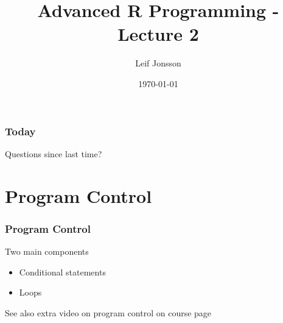 \documentclass{beamer}
\title[Lecture 2]{Advanced R Programming - Lecture 2} %
\author{Leif Jonsson} %
\institute[STIMA LiU] %
{
Link\"{o}ping University \\ %
\medskip
\textit{leif.jonsson@ericsson.com\\leif.r.jonsson@liu.se} %
}
\date{\today} %
\begin{document}
\begin{frame}
\titlepage %
\end{frame}

\begin{frame}
\frametitle{Today} %
\tableofcontents %
\end{frame}


\begin{frame}
	\Huge{\centerline{Questions since last time?}}
\end{frame}

\section{Program Control} %

\begin{frame}
\frametitle{Program Control}
Two main components
\begin{itemize}
\item Conditional statements
\item Loops
\end{itemize}
See also extra video on program control on course page
\end{frame}

\end{document}
